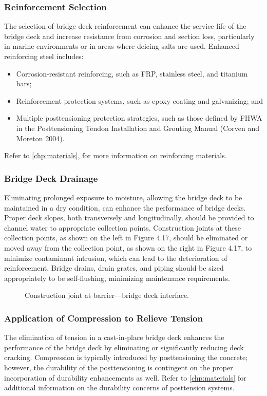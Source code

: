 \subsubsection{Reinforcement Selection}
The selection of bridge deck reinforcement can enhance the service life of the bridge deck and increase resistance
from corrosion and section loss, particularly in marine environments or in areas where deicing salts are used.
Enhanced reinforcing steel includes:
\begin{itemize}
  \item Corrosion-resistant reinforcing, such as FRP, stainless steel, and titanium bars;
  \item Reinforcement protection systems, such as epoxy coating and galvanizing; and
  \item Multiple posttensioning protection strategies, such as those defined by FHWA in the Posttensioning Tendon
  Installation and Grouting Manual (Corven and Moreton 2004).
\end{itemize}

Refer to \cref{chp:materials}, for more information on reinforcing materials.

\subsubsection{Bridge Deck Drainage}
Eliminating prolonged exposure to moisture, allowing the bridge deck to be maintained in a dry condition, can
enhance the performance of bridge decks. Proper deck slopes, both transversely and longitudinally, should be
provided to channel water to appropriate collection points. Construction joints at these collection points, as shown on
the left in Figure 4.17, should be eliminated or moved away from the collection point, as shown on the right in Figure
4.17, to minimize contaminant intrusion, which can lead to the deterioration of reinforcement. Bridge drains, drain
grates, and piping should be sized appropriately to be self-flushing, minimizing maintenance requirements.

\begin{figure}
  \caption{Construction joint at barrier—bridge deck interface.}
  \label{fig:joint-barrier}
\end{figure}

\subsubsection{Application of Compression to Relieve Tension}
The elimination of tension in a cast-in-place bridge deck enhances the performance of the bridge deck by
eliminating or significantly reducing deck cracking. Compression is typically introduced by posttensioning the
concrete; however, the durability of the posttensioning is contingent on the proper incorporation of durability
enhancements as well. Refer to \cref{chp:materials} for additional information on the durability concerns of posttension
systems.

